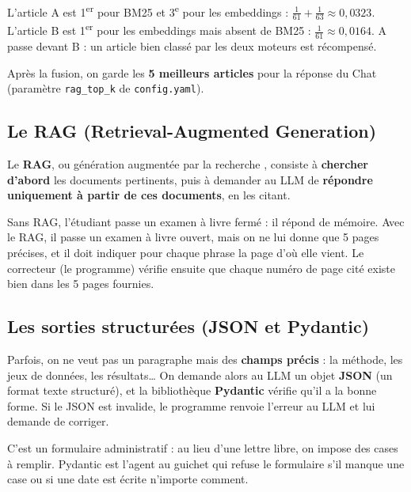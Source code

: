\documentclass[11pt,a4paper]{article}
\newcommand{\code}[1]{\texttt{#1}}
\begin{document}
\begin{exemple}
L'article A est 1\textsuperscript{er} pour BM25 et 3\textsuperscript{e} pour les
embeddings : $\frac{1}{61}+\frac{1}{63}\approx 0{,}0323$.
L'article B est 1\textsuperscript{er} pour les embeddings mais absent de BM25 :
$\frac{1}{61}\approx 0{,}0164$.
A passe devant B : un article bien classé par les deux moteurs est récompensé.
\end{exemple}

Après la fusion, on garde les \textbf{5 meilleurs articles} pour la réponse du Chat
(paramètre \code{rag\_top\_k} de \code{config.yaml}).

\subsection{Le RAG (Retrieval-Augmented Generation)}

Le \textbf{RAG}, ou \og génération augmentée par la recherche \fg{}, consiste à
\textbf{chercher d'abord} les documents pertinents, puis à demander au LLM de
\textbf{répondre uniquement à partir de ces documents}, en les citant.

\begin{analogie}
Sans RAG, l'étudiant passe un examen à livre fermé : il répond de mémoire. Avec le RAG, il
passe un examen à livre ouvert, mais on ne lui donne que 5 pages précises, et il doit
indiquer pour chaque phrase la page d'où elle vient. Le correcteur (le programme) vérifie
ensuite que chaque numéro de page cité existe bien dans les 5 pages fournies.
\end{analogie}

\subsection{Les sorties structurées (JSON et Pydantic)}

Parfois, on ne veut pas un paragraphe mais des \textbf{champs précis} : la méthode, les jeux
de données, les résultats\ldots{} On demande alors au LLM un objet \textbf{JSON} (un format
texte structuré), et la bibliothèque \textbf{Pydantic} vérifie qu'il a la bonne forme. Si le
JSON est invalide, le programme renvoie l'erreur au LLM et lui demande de corriger.

\begin{analogie}
C'est un formulaire administratif : au lieu d'une lettre libre, on impose des cases à
remplir. Pydantic est l'agent au guichet qui refuse le formulaire s'il manque une case ou si
une date est écrite n'importe comment.
\end{analogie}
\end{document}
